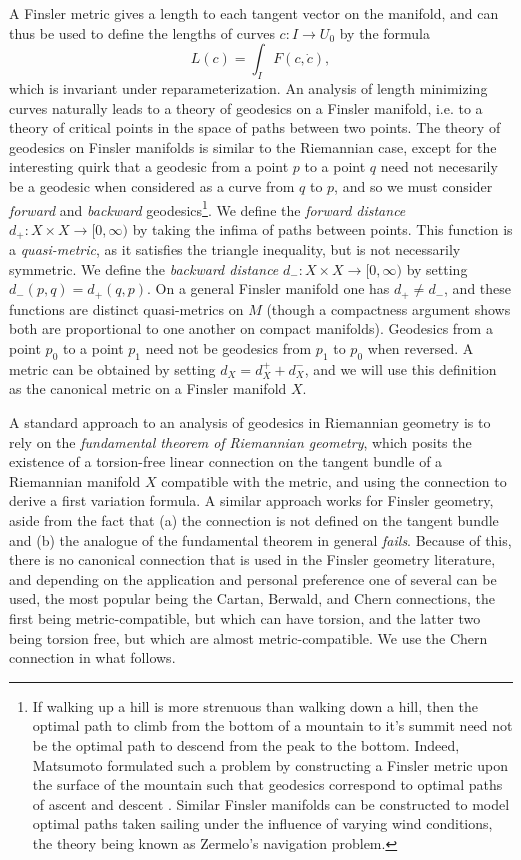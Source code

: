 A Finsler metric gives a length to each tangent vector on the manifold, and can thus be used to define the lengths of curves $c: I \to U_0$ by the formula
%
\begin{equation}
  L(c) = \int_I F(c,\dot{c}),
\end{equation}
%
which is invariant under reparameterization. An analysis of length minimizing curves naturally leads to a theory of geodesics on a Finsler manifold, i.e. to a theory of critical points in the space of paths between two points. The theory of geodesics on Finsler manifolds is similar to the Riemannian case, except for the interesting quirk that a geodesic from a point $p$ to a point $q$ need not necesarily be a geodesic when considered as a curve from $q$ to $p$, and so we must consider \emph{forward} and \emph{backward} geodesics\footnote{If walking up a hill is more strenuous than walking down a hill, then the optimal path to climb from the bottom of a mountain to it's summit need not be the optimal path to descend from the peak to the bottom. Indeed, Matsumoto formulated such a problem by constructing a Finsler metric upon the surface of the mountain such that geodesics correspond to optimal paths of ascent and descent \cite{Matsumoto}. Similar Finsler manifolds can be constructed to model optimal paths taken sailing under the influence of varying wind conditions, the theory being known as Zermelo's navigation problem.}. We define the \emph{forward distance} $d_+: X \times X \to [0,\infty)$ by taking the infima of paths between points. This function is a \emph{quasi-metric}, as it satisfies the triangle inequality, but is not necessarily symmetric. We define the \emph{backward distance} $d_-: X \times X \to [0,\infty)$ by setting $d_-(p,q) = d_+(q,p)$. On a general Finsler manifold one has $d_+ \neq d_-$, and these functions are distinct quasi-metrics on $M$ (though a compactness argument shows both are proportional to one another on compact manifolds). Geodesics from a point $p_0$ to a point $p_1$ need not be geodesics from $p_1$ to $p_0$ when reversed. A metric can be obtained by setting $d_X = d_X^+ + d_X^-$, and we will use this definition as the canonical metric on a Finsler manifold $X$.

A standard approach to an analysis of geodesics in Riemannian geometry is to rely on the \emph{fundamental theorem of Riemannian geometry}, which posits the existence of a torsion-free linear connection on the tangent bundle of a Riemannian manifold $X$ compatible with the metric, and using the connection to derive a first variation formula. A similar approach works for Finsler geometry, aside from the fact that (a) the connection is not defined on the tangent bundle and (b) the analogue of the fundamental theorem in general \emph{fails}. Because of this, there is no canonical connection that is used in the Finsler geometry literature, and depending on the application and personal preference one of several can be used, the most popular being the Cartan, Berwald, and Chern connections, the first being metric-compatible, but which can have torsion, and the latter two being torsion free, but which are almost metric-compatible. We use the Chern connection in what follows.


